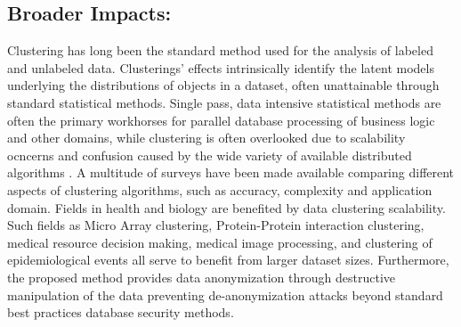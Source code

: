 \documentclass[a4paper,10pt]{article}
\begin{document}
\subsection*{Broader Impacts:} Clustering has long been the standard method
used for the analysis of labeled and unlabeled data.  Clusterings' effects
intrinsically identify the latent models underlying the distributions
of objects in a dataset, often unattainable through standard statistical
methods.  Single pass, data intensive statistical methods are often the
primary workhorses for parallel database processing of business logic and
other domains, while clustering is often overlooked due to scalability
ocncerns and confusion caused by the wide variety of available distributed
algorithms \cite{clusters}.  A multitude of surveys \cite{clusters} have
been made available comparing different aspects of clustering algorithms,
such as accuracy, complexity and application domain.  Fields in health and
biology are benefited by data clustering scalability.  Such fields as Micro
Array clustering, Protein-Protein interaction clustering, medical resource
decision making, medical image processing, and clustering of epidemiological
events all serve to benefit from larger dataset sizes. Furthermore, the
proposed method provides data anonymization through destructive manipulation
of the data preventing de-anonymization attacks beyond standard best practices
database security methods.
\newpage
{}
\setcounter{section}{0}
\pagestyle{plain}
\end{document}
